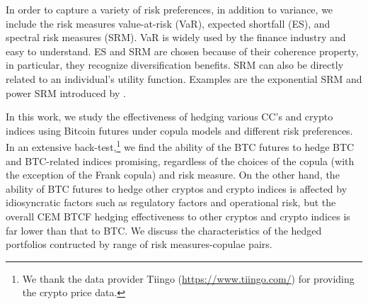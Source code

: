 \documentclass[11pt,a4paper,english]{article}
\providecommand{\natp}[1]{\textcolor{darkorange}{#1}}
\begin{document}
In order to capture a variety of risk preferences, in addition to
variance, we include the risk measures value-at-risk (VaR), expected
shortfall (ES), and spectral risk measures (SRM). 
VaR is widely used by the finance industry and easy to understand. 
ES and SRM are chosen because of their coherence property, in
particular, they recognize diversification benefits.
SRM can also be directly related to an individual's utility function.
Examples are the exponential SRM and power SRM introduced by
\citet{dowd2008spectral}. 

%

In this work, we study the effectiveness of hedging various CC's and
crypto indices using Bitcoin futures under copula models and different
risk preferences. 
In an extensive back-test,\footnote{We thank the data provider
  Tiingo (\href{https://www.tiingo.com/}{https://www.tiingo.com/}) for
  providing the crypto price data.}
 we find the ability of the BTC futures to hedge BTC and BTC-related
 indices promising, regardless of the choices of the copula (with the
 exception of the Frank copula) and risk measure. 
On the other hand, the ability of BTC futures to hedge other cryptos and crypto indices
is affected by idiosyncratic factors such as regulatory factors and operational risk,
but the overall CEM BTCF hedging effectiveness to other cryptos and crypto indices is far lower
than that to BTC.
We discuss the characteristics of the hedged portfolios contructed by range of risk measures-copulae pairs.
\end{document}
